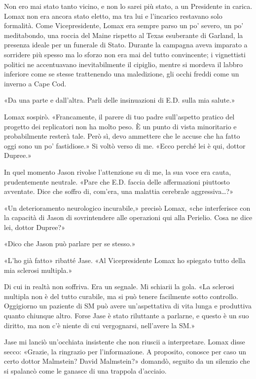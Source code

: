 Non ero mai stato tanto vicino, e non lo sarei più stato, a un
Presidente in carica. Lomax non era ancora stato eletto, ma tra lui e
l'incarico restavano solo formalità. Come Vicepresidente, Lomax era
sempre parso un po' severo, un po' meditabondo, una roccia del Maine
rispetto al Texas esuberante di Garland, la presenza ideale per un
funerale di Stato. Durante la campagna aveva imparato a sorridere più
spesso ma lo sforzo non era mai del tutto convincente; i vignettisti
politici ne accentuavano inevitabilmente il cipiglio, mentre si mordeva
il labbro inferiore come se stesse trattenendo una maledizione, gli
occhi freddi come un inverno a Cape Cod.

«Da una parte e dall'altra. Parli delle insinuazioni di E.D. sulla mia
salute.»

Lomax sospirò. «Francamente, il parere di tuo padre sull'aspetto pratico
del progetto dei replicatori non ha molto peso. È un punto di vista
minoritario e probabilmente resterà tale. Però sì, devo ammettere che le
accuse che ha fatto oggi sono un po' fastidiose.» Si voltò verso di me.
«Ecco perché lei è qui, dottor Dupree.»

In quel momento Jason rivolse l'attenzione su di me, la sua voce era
cauta, prudentemente neutrale. «Pare che E.D. faccia delle affermazioni
piuttosto avventate. Dice che soffro di, com'era, una malattia cerebrale
aggressiva\ldots?»

«Un deterioramento neurologico incurabile,» precisò Lomax, «che
interferisce con la capacità di Jason di sovrintendere alle operazioni
qui alla Perielio. Cosa ne dice lei, dottor Dupree?»

«Dico che Jason può parlare per se stesso.»

«L'ho già fatto» ribatté Jase. «Al Vicepresidente Lomax ho spiegato
tutto della mia sclerosi multipla.»

Di cui in realtà non soffriva. Era un segnale. Mi schiarii la gola. «La
sclerosi multipla non è del tutto curabile, ma si può tenere facilmente
sotto controllo. Oggigiorno un paziente di SM può avere un'aspettativa
di vita lunga e produttiva quanto chiunque altro. Forse Jase è stato
riluttante a parlarne, e questo è un suo diritto, ma non c'è niente di
cui vergognarsi, nell'avere la SM.»

Jase mi lanciò un'occhiata insistente che non riuscii a interpretare.
Lomax disse secco: «Grazie, la ringrazio per l'informazione. A
proposito, conosce per caso un certo dottor Malmstein? David Malmstein?»
domandò, seguito da un silenzio che si spalancò come le ganasce di una
trappola d'acciaio.

